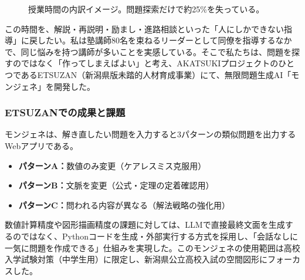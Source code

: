 \documentclass[paper=a4,fontsize=10.5bp,jafontsize=10.5bp,twocolumn]{jlreq}
\begin{document}
\begin{figure}[t]
\centering
{}
\caption{授業時間の内訳イメージ。問題探索だけで約25\%を失っている。}
\label{fig:time_pie}
\end{figure}

この時間を、解説・再説明・励まし・進路相談といった「人にしかできない指導」に戻したい。私は塾講師80名を束ねるリーダーとして同僚を指導するなかで、同じ悩みを持つ講師が多いことを実感している。そこで私たちは、問題を探すのではなく「作ってしまえばよい」と考え、AKATSUKIプロジェクトのひとつであるETSUZAN（新潟県版未踏的人材育成事業）にて、無限問題生成AI「モンジェネ」を開発した。

\subsubsection{ETSUZANでの成果と課題}

モンジェネは、解き直したい問題を入力すると3パターンの類似問題を出力するWebアプリである。

\begin{itemize}
  \item \textbf{パターンA：}数値のみ変更（ケアレスミス克服用）
  \item \textbf{パターンB：}文脈を変更（公式・定理の定着確認用）
  \item \textbf{パターンC：}問われる内容が異なる（解法戦略の強化用）
\end{itemize}

数値計算精度や図形描画精度の課題に対しては、LLMで直接最終文面を生成するのではなく、Pythonコードを生成・外部実行する方式を採用し、「会話なしに一気に問題を作成できる」仕組みを実現した。このモンジェネの使用範囲は高校入学試験対策（中学生用）に限定し、新潟県公立高校入試の空間図形にフォーカスした。
\end{document}
